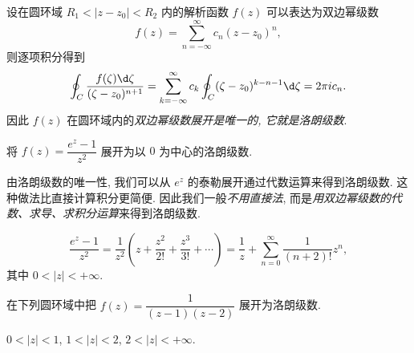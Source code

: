 设在圆环域 $R_1<|z-z_0|<R_2$ 内的解析函数 $f(z)$ 可以表达为双边幂级数
\[f(z)=\sum_{n=-\infty}^\infty c_n(z-z_0)^n,\]
则逐项积分得到
\[\oint_C\frac{f(\zeta)\d\zeta}{(\zeta-z_0)^{n+1}}=\sum_{k=-\infty}^\infty c_k\oint_C(\zeta-z_0)^{k-n-1}\d\zeta=2\pi i c_n.\]
因此 $f(z)$ 在圆环域内的\emph{双边幂级数展开是唯一的, 它就是洛朗级数}.

\begin{example}
	将 $f(z)=\dfrac{e^z-1}{z^2}$ 展开为以 $0$ 为中心的洛朗级数.
\end{example}

由洛朗级数的唯一性, 我们可以从 $e^z$ 的泰勒展开通过代数运算来得到洛朗级数.
这种做法比直接计算积分更简便.
因此我们一般\emph{不用直接法}, 而是\emph{用双边幂级数的代数、求导、求积分运算}来得到洛朗级数.

\begin{solution}
	\[\frac{e^z-1}{z^2}=\frac1{z^2}\left(z+\frac{z^2}{2!}+\frac{z^3}{3!}+\cdots\right)
	{=\frac1z+\sum_{n=0}^\infty \frac1{(n+2)!}z^n,}\]
	{其中 $0<|z|<+\infty$.}
\end{solution}

\begin{example}
	在下列圆环域中把 $f(z)=\dfrac1{(z-1)(z-2)}$ 展开为洛朗级数.

	{ $0<|z|<1$,  $1<|z|<2$,  $2<|z|<+\infty$.}
\end{example}

